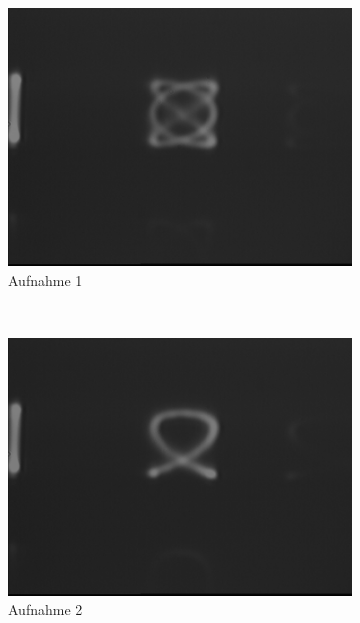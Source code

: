 \documentclass[bigchapter,colorback,accentcolor=tud4b,linedtoc,11pt]{tudreport}
\begin{document}
\begin{figure}[H]
  \centering
  \begin{subfigure}[h]{0.32\textwidth}
    \includegraphics[width=\textwidth]{data/Aufgabe7/2-3-(x-y)halbe.png}
    \caption[Cap for listoffigures]{Aufnahme 1}
  \end{subfigure}~%
  \begin{subfigure}[h]{0.32\textwidth}
    \includegraphics[width=\textwidth]{data/Aufgabe7/2-3-x.png}
    \caption[Cap for listoffigures]{Aufnahme 2}
  \end{subfigure}~%
  \begin{subfigure}[h]{0.32\textwidth}

\end{subfigure}
\end{figure}
\end{document}

